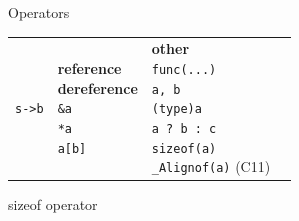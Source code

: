 \begin{frame}{Operators}
{\begin{tabular}{llll}
{                \texttt{s->b}                    \\
            } &
            \specialcell{\textbf{reference} \\ \textbf{dereference}  \\
                \texttt{\&a}                     \\
                \texttt{*a}                      \\
                \texttt{a[b]}                    \\
            } &
            \specialcell{\textbf{other}          \\
                \texttt{func(...)}               \\
                \texttt{a, b}                    \\
                \texttt{(type)a}                 \\
                \texttt{a ? b : c}               \\
                \texttt{sizeof(a)}               \\
                \texttt{\_Alignof(a)} (C11)      \\
            } \\
        \end{tabular}
    }
\end{frame}
\begin{frame}{sizeof operator}
    
\end{frame}
